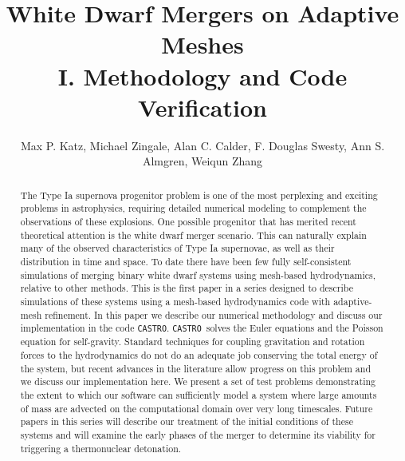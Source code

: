 \documentclass[iop]{../emulateapj}
\newcommand{\castro}{\texttt{CASTRO}}
\begin{document}
\title{White Dwarf Mergers on Adaptive Meshes\\ I. Methodology and Code Verification}


\author{Max P. Katz, Michael Zingale, Alan C. Calder, F. Douglas Swesty, Ann S. Almgren, Weiqun Zhang}
\begin{abstract}
The Type Ia supernova progenitor problem is one of the most perplexing and 
exciting problems in astrophysics, requiring detailed numerical modeling to 
complement the observations of these explosions. One possible progenitor that has 
merited recent theoretical attention is the white dwarf merger scenario.
This can naturally explain many of the observed characteristics of 
Type Ia supernovae, as well as their distribution in time and space.
To date there have been few fully self-consistent simulations 
of merging binary white dwarf systems using mesh-based hydrodynamics, 
relative to other methods. This is the first paper in a series designed to 
describe simulations of these systems using a mesh-based hydrodynamics code with 
adaptive-mesh refinement. In this paper we describe our numerical 
methodology and discuss our implementation in the code \castro. \castro\ 
solves the Euler equations 
and the Poisson equation for self-gravity. Standard techniques for 
coupling gravitation and rotation forces to the hydrodynamics do 
not do an adequate job conserving the total energy of the system, 
but recent advances in the literature allow progress on this 
problem and we discuss our implementation here. We present a
set of test problems demonstrating the extent to which our software can sufficiently
model a system where large amounts of mass are advected on the computational 
domain over very long timescales. Future papers in this series will describe
our treatment of the initial conditions of these systems and will 
examine the early phases of the merger to determine its viability
for triggering a thermonuclear detonation.

\end{abstract}

\end{document}
